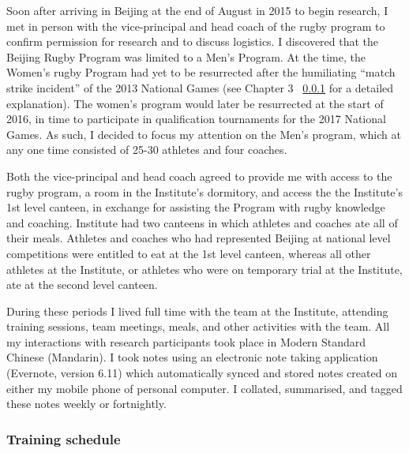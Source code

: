Soon after arriving in Beijing at the end of August in 2015 to begin research, I met in person with the vice-principal and head coach of the rugby program to confirm permission for research and to discuss logistics.  I discovered that the Beijing Rugby Program was limited to a Men's Program.  At the time, the Women's rugby Program had yet to be resurrected after the humiliating ``match strike incident'' of the 2013 National Games (see Chapter 3 ~\ref{} for a detailed explanation). The women's program would later be resurrected at the start of 2016, in time to participate in qualification tournaments for the 2017 National Games.  As such, I decided to focus my attention on the Men's program, which at any one time consisted of 25-30 athletes and four coaches.

Both the vice-principal and head coach agreed to provide me with access to the rugby program, a room in the Institute's dormitory, and access the the Institute's 1st level canteen, in exchange for assisting the Program with rugby knowledge and coaching.   Institute had two canteens in which athletes and coaches ate all of their meals.  Athletes and coaches who had represented Beijing at national level competitions were entitled to eat at the 1st level canteen, whereas all other athletes at the Institute, or athletes who were on temporary trial at the Institute, ate at the second level canteen.

During these periods I lived full time with the team at the Institute, attending training sessions, team meetings, meals, and other activities with the team.   All my interactions with research participants took place in Modern Standard Chinese (Mandarin).  I took notes using an electronic note taking application (Evernote, version 6.11) which automatically synced and stored notes created on either my mobile phone of personal computer. I collated, summarised, and tagged these notes weekly or fortnightly.





\subsubsection{Training schedule}

